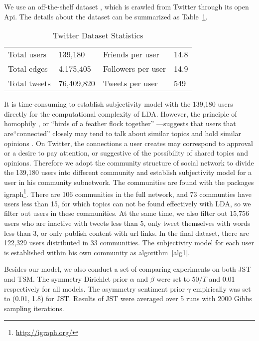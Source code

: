 \begin{landscape}
We use an off-the-shelf dataset \cite{DBLP:conf/kdd/LiWDWC12}, which is crawled from Twitter through its open Api. The details about the dataset can be summarized as Table~\ref{tab1}. 

\begin{table}
\centering
\caption{Twitter Dataset Statistics}
\label{tab1}
\begin{tabular}{ll|ll}
\hline
Total users  & 139,180 & Friends per user & 14.8 \\
Total edges &  4,175,405 & Followers per user & 14.9  \\
Total tweets & 76,409,820 & Tweets per user & 549 \\
\hline
\end{tabular}
\end{table}

It is time-consuming to establish subjectivity model with the 139,180 users directly for the computational complexity of LDA. However, the principle of homophily \cite{lazarsfeld_friendship_1954}, or ``birds of a feather flock together'' \cite{mcpherson2001birds} —suggests that users that are``connected'' closely may tend to talk about similar topics and hold similar opinions \cite{thelwall2010emotion}. On Twitter, the connections a user creates may correspond to approval or a desire to pay attention, or suggestive of the possibility of shared topics and opinions. Therefore we adopt the community structure of social network to divide the  139,180 users into different community and establish subjectivity model for a user in his community subnetwork. The communities are found with the packages igraph\footnote{\url{http://igraph.org/}}. There are 106 communities in the full network, and 73 communties have users less than 15, for which topics can not be found effectively with LDA, so we filter out users in these communities. At the same time, we also filter out 15,756 users who are inactive with tweets less than 5, only tweet themselves with words less than 3, or only publish content with url links. In the final dataset, there are 122,329 users distributed in 33 communities. The subjectivity model for each user is established within his own community as algorithm~\ref{alg1}.

Besides our model, we also conduct a set of comparing experiments on both JST and TSM. The symmetry Dirichlet prior $ \alpha $ and $ \beta $ were set to $ 50/T $ and 0.01 respectively for all models. The asymmetry sentiment prior $ \gamma $ empirically was set to (0.01, 1.8) for JST. Results of JST were averaged over 5 runs with 2000 Gibbs sampling iterations.


\end{landscape}
